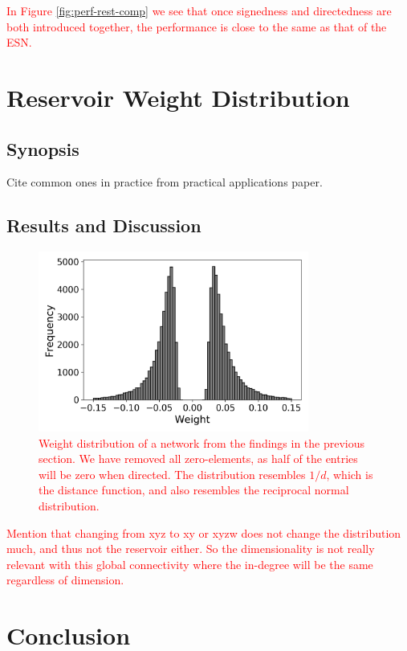 \textcolor{red}{
  In Figure \ref{fig:perf-rest-comp} we see that once signedness and
directedness are both introduced together, the performance is close to the same
as that of the ESN.
}

\section{Reservoir Weight Distribution}

\subsection{Synopsis}

Cite common ones in practice from practical applications paper.

\subsection{Results and Discussion}

\begin{figure}[t]
  \centering
  \includegraphics[width=3.5in]{figures/rgg-dist.png}
  \caption{
    \textcolor{red}{
      Weight distribution of a network from the findings in the previous
section. We have removed all zero-elements, as half of the entries will be zero
when directed. The distribution resembles $1/d$, which is the distance function,
and also resembles the reciprocal normal distribution.
    }
  }
  \label{fig:rgg-dist}
\end{figure}

\textcolor{red}{
  Mention that changing from xyz to xy or xyzw does not change the distribution
much, and thus not the reservoir either. So the dimensionality is not really
relevant with this global connectivity where the in-degree will be the same
regardless of dimension.
}

\section{Conclusion}

